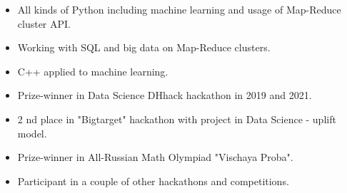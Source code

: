 \documentclass[10pt,a4paper,ragged2e]{altacv}
\begin{document}

\begin{fullwidth}
\makecvheader
\end{fullwidth}



\begin{itemize}
\item All kinds of Python including machine learning and usage of Map-Reduce cluster API.
\smallskip
\item Working with SQL and big data on Map-Reduce clusters.
\smallskip
\item C++ applied to machine learning.
\end{itemize}




\smallskip
\begin{itemize}
\item Prize-winner in Data Science DHhack hackathon in 2019 and 2021.
\smallskip
\item 2 nd place in "Bigtarget" hackathon with project in Data Science - uplift model.
\smallskip
\item Prize-winner in All-Russian Math Olympiad "Vischaya Proba".
\smallskip
\item Participant in a couple of other hackathons and competitions.
\end{itemize}
\end{document}
